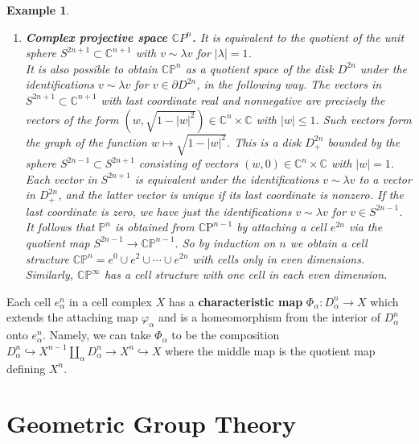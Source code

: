 \documentclass{book}
\newtheorem{example}{Example}
\begin{document}
\begin{example}
\begin{enumerate}
        \item \textbf{Complex projective space $\mathbb{C} P^n$.} It is equivalent to the quotient of the unit sphere $S^{2 n+1} \subset \mathbb{C}^{n+1}$ with $v \sim \lambda v$ for $|\lambda|=1$. \\
        It is also possible to obtain $\mathbb{C P}^n$ as a quotient space of the disk $D^{2 n}$ under the identifications $v \sim \lambda v$ for $v \in \partial D^{2 n}$, in the following way. The vectors in $S^{2 n+1} \subset \mathbb{C}^{n+1}$ with last coordinate real and nonnegative are precisely the vectors of the form $\left(w, \sqrt{1-|w|^2}\right) \in \mathbb{C}^n \times \mathbb{C}$ with $|w| \leq 1$. Such vectors form the graph of the function $w \mapsto \sqrt{1-|w|^2}$. This is a disk $D_{+}^{2 n}$ bounded by the sphere $S^{2 n-1} \subset S^{2 n+1}$ consisting of vectors $(w, 0) \in \mathbb{C}^n \times \mathbb{C}$ with $|w|=1$. Each vector in $S^{2 n+1}$ is equivalent under the identifications $v \sim \lambda v$ to a vector in $D_{+}^{2 n}$, and the latter vector is unique if its last coordinate is nonzero. If the last coordinate is zero, we have just the identifications $v \sim \lambda v$ for $v \in S^{2 n-1}$.\\
        It follows that $\mathbb{P}^n$ is obtained from $\mathbb{C} \mathrm{P}^{n-1}$ by attaching a cell $e^{2 n}$ via the quotient map $S^{2 n-1} \rightarrow \mathbb{C P}^{n-1}$. So by induction on $n$ we obtain a cell structure $\mathbb{C P}^n=e^0 \cup e^2 \cup \cdots \cup e^{2 n}$ with cells only in even dimensions. Similarly, $\mathbb{C P}^{\infty}$ has a cell structure with one cell in each even dimension.
    \end{enumerate}
\end{example}

Each cell $e_\alpha^n$ in a cell complex $X$ has a \textbf{characteristic map} $\Phi_\alpha: D_\alpha^n \rightarrow X$ which extends the attaching map $\varphi_\alpha$ and is a homeomorphism from the interior of $D_\alpha^n$ onto $e_\alpha^n$. Namely, we can take $\Phi_\alpha$ to be the composition $D_\alpha^n \hookrightarrow X^{n-1} \coprod_\alpha D_\alpha^n \rightarrow X^n \hookrightarrow X$ where the middle map is the quotient map defining $X^n$. 









\chapter{Geometric Group Theory}
\end{document}
